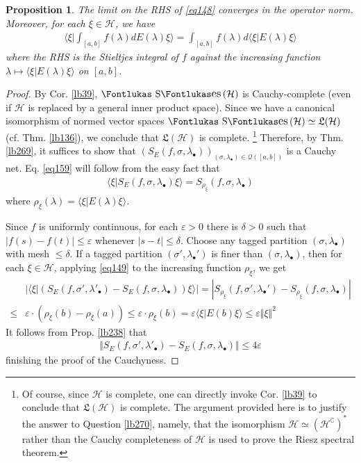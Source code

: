 \documentclass[12pt,b5paper,notitlepage]{article}
\theoremstyle{definition}
\theoremstyle{plain}
\newtheorem{pp}[df]{Proposition}
\DeclareMathOperator{\Ses}{\text{\Fontlukas S}\text{\kern -0pt {\Fontlukas\large es}}\,}
\newcommand{\fk}{\mathfrak}
\newcommand{\mc}{\mathcal}
\newcommand{\bk}[1]{\langle {#1}\rangle}
\newcommand{\bigbk}[1]{\big\langle {#1}\big\rangle}
\newcommand{\Bigbk}[1]{\Big\langle {#1}\Big\rangle}
\newcommand{\Co}{\complement}
\newcommand{\blt}{\bullet}
\newcommand{\eps}{\varepsilon}
\newcommand{\MH}{\mathcal H}
\numberwithin{equation}{section}
\begin{document}
\begin{pp}\label{lb282}
The limit on the RHS of \eqref{eq148} converges in the operator norm. Moreover, for each $\xi\in\MH$, we have
\begin{align}\label{eq159}
\Bigbk{\xi\Big|\int_{[a,b]}f(\lambda)dE(\lambda)\xi}=\int_{[a,b]}f(\lambda)d\bk{\xi|E(\lambda)\xi}
\end{align}
where the RHS is the Stieltjes integral of $f$ against the increasing function $\lambda\mapsto\bk{\xi|E(\lambda)\xi}$ on $[a,b]$.
\end{pp}




\begin{proof}
By Cor. \ref{lb39}, $\Ses(\MH)$ is Cauchy-complete (even if $\MH$ is replaced by a general inner product space). Since we have a canonical isomorphism of normed vector spaces $\Ses(\MH)\simeq\fk L(\MH)$ (cf. Thm. \ref{lb136}), we conclude that $\fk L(\MH)$ is complete. \footnote{Of course, since $\MH$ is complete, one can directly invoke Cor. \ref{lb39} to conclude that $\fk L(\MH)$ is complete. The argument provided here is to justify the answer to Question \ref{lb270}, namely, that the isomorphism $\MH\simeq(\MH^\Co)^*$ rather than the Cauchy completeness of $\MH$ is used to prove the Riesz spectral theorem.} Therefore, by Thm. \ref{lb269}, it suffices to show that $(S_E(f,\sigma,\lambda_\blt))_{(\sigma,\lambda_\blt)\in\mc Q([a,b])}$ is a Cauchy net. Eq. \eqref{eq159} will follow from the easy fact that
\begin{align}
\bigbk{\xi\big|S_E(f,\sigma,\lambda_\blt)\xi}=S_{\rho_\xi}(f,\sigma,\lambda_\blt)
\end{align}
where $\rho_\xi(\lambda)=\bk{\xi|E(\lambda)\xi}$.



Since $f$ is uniformly continuous, for each $\eps>0$ there is $\delta>0$ such that $|f(s)-f(t)|\leq\eps$ whenever $|s-t|\leq\delta$. Choose any tagged partition $(\sigma,\lambda_\blt)$ with mesh $\leq\delta$. If a tagged partition $(\sigma',\lambda_\blt')$ is finer than $(\sigma,\lambda_\blt)$, then for each $\xi\in\MH$, applying \eqref{eq149} to the increasing function $\rho_\xi$, we get
\begin{align*}
&\Big|\bigbk{\xi\big|(S_E(f,\sigma',\lambda'_\blt)-S_E(f,\sigma,\lambda_\blt))\xi}\Big|=|S_{\rho_\xi}(f,\sigma',\lambda_\blt')-S_{\rho_\xi}(f,\sigma,\lambda_\blt)|\\
\leq& \eps\cdot(\rho_\xi(b)-\rho_\xi(a))\leq\eps\cdot\rho_\xi(b)=\eps\bk{\xi|E(b)\xi}\leq\eps\Vert\xi\Vert^2
\end{align*}
It follows from Prop. \ref{lb238} that
\begin{align*}
\Vert S_E(f,\sigma',\lambda'_\blt)-S_E(f,\sigma,\lambda_\blt)\Vert\leq 4\eps
\end{align*}
finishing the proof of the Cauchyness.
\end{proof}
\end{document}
